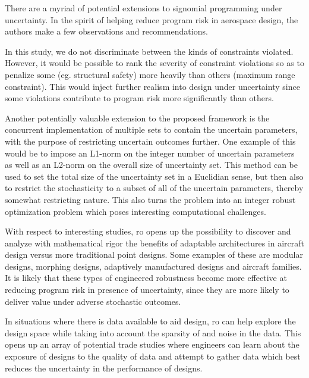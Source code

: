 There are a myriad of potential extensions to signomial programming under uncertainty.
In the spirit of helping reduce program risk in aerospace design,
the authors make a few observations and recommendations.

In this study, we do not discriminate between the kinds of constraints violated. However, it would
be possible to rank the severity of constraint violations so as to penalize some (eg. structural safety)
more heavily than others (maximum range constraint). This would inject further realism into
design under uncertainty since some violations contribute to program risk more
significantly than others.

Another potentially valuable extension to the proposed framework is the concurrent implementation
of multiple sets to contain the uncertain parameters, with the purpose of restricting uncertain
outcomes further. One example of this would be to impose an  L1-norm on the integer number of uncertain parameters
as well as an L2-norm on the overall size of uncertainty set.
This method can be used to set the total size of the uncertainty set in a Euclidian sense,
but then also to restrict the stochasticity to a subset of all of the uncertain parameters,
thereby somewhat restricting nature. This also turns the problem into an integer robust
optimization problem which poses interesting computational challenges.

With respect to interesting studies, \gls{ro} opens up the possibility to discover and analyze
with mathematical rigor the benefits
of adaptable architectures in aircraft design versus more traditional point designs.
Some examples of these are modular designs, morphing designs,
adaptively manufactured designs and aircraft families. It is likely that these types of engineered
robustness become more effective at reducing program risk
in presence of uncertainty, since they are more likely
to deliver value under adverse stochastic outcomes.

In situations where there is data available to aid design, \gls{ro} can help explore
the design space while taking into account the sparsity of and noise in the data.
This opens up an array of potential trade studies where engineers can learn about
the exposure of designs to the quality of data and attempt to gather
data which best reduces the uncertainty in the performance of designs.
